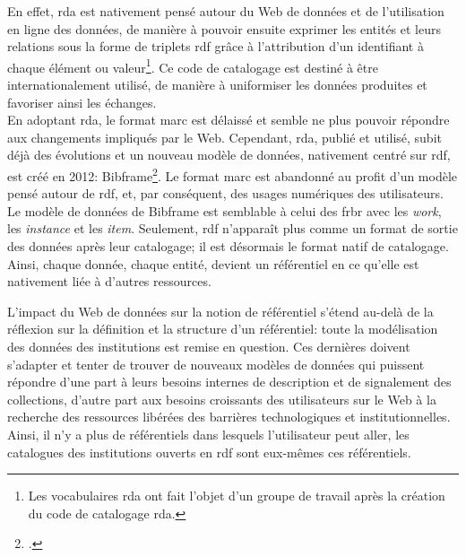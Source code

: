 En effet, \ac{rda} est nativement pensé autour du Web de données et de l'utilisation en ligne des données, de manière à pouvoir ensuite exprimer les entités et leurs relations sous la forme de triplets \ac{rdf} grâce à l'attribution d'un identifiant à chaque élément ou valeur\footnote{Les vocabulaires \ac{rda} ont fait l'objet d'un groupe de travail après la création du code de catalogage \ac{rda}.}. Ce code de catalogage est destiné à être internationalement utilisé, de manière à uniformiser les données produites et favoriser ainsi les échanges.\\

En adoptant \ac{rda}, le format \ac{marc} est délaissé et semble ne plus pouvoir répondre aux changements impliqués par le Web. Cependant, \ac{rda}, publié et utilisé, subit déjà des évolutions et un nouveau modèle de données, nativement centré sur \ac{rdf}, est créé en 2012: Bibframe\footcite{library_of_congress_overview_2016}. Le format \ac{marc} est abandonné au profit d'un modèle pensé autour de \ac{rdf}, et, par conséquent, des usages numériques des utilisateurs. Le modèle de données de Bibframe est semblable à celui des \ac{frbr} avec les \textit{work}, les \textit{instance} et les \textit{item}. Seulement, \ac{rdf} n'apparaît plus comme un format de sortie des données après leur catalogage; il est désormais le format natif de catalogage. Ainsi, chaque donnée, chaque entité, devient un référentiel en ce qu'elle est nativement liée à d'autres ressources.

\bigskip
\bigskip
L'impact du Web de données sur la notion de référentiel s'étend au-delà de la réflexion sur la définition et la structure d'un référentiel: toute la modélisation des données des institutions est remise en question. Ces dernières doivent s'adapter et tenter de trouver de nouveaux modèles de données qui puissent répondre d'une part à leurs besoins internes de description et de signalement des collections, d'autre part aux besoins croissants des utilisateurs sur le Web à la recherche des ressources libérées des barrières technologiques et institutionnelles. Ainsi, il n'y a plus de référentiels dans lesquels l'utilisateur peut aller, les catalogues des institutions ouverts en \ac{rdf} sont eux-mêmes ces référentiels.